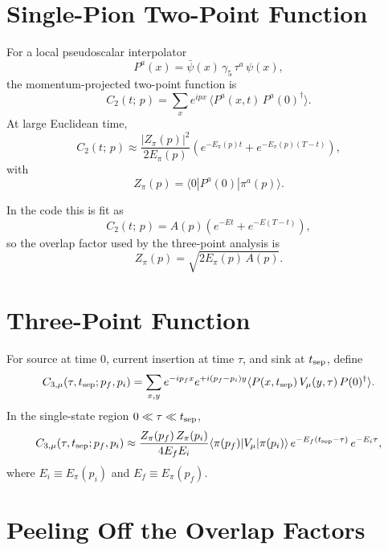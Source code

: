 \documentclass[11pt]{article}
\begin{document}
\section{Single-Pion Two-Point Function}
For a local pseudoscalar interpolator
\begin{equation}
  P^a(x) = \bar\psi(x)\,\gamma_5\,\tau^a\,\psi(x),
\end{equation}
the momentum-projected two-point function is
\begin{equation}
  C_2(t;\,p)
  =
  \sum_x e^{ipx}\,
  \langle P^a(x,t)\,P^a(0)^\dagger \rangle.
\end{equation}
At large Euclidean time,
\begin{equation}
  C_2(t;\,p)
  \approx
  \frac{|Z_\pi(p)|^2}{2E_\pi(p)}
  \left(
    e^{-E_\pi(p)t}
    +
    e^{-E_\pi(p)(T-t)}
  \right),
\end{equation}
with
\begin{equation}
  Z_\pi(p) = \langle 0|P^a(0)|\pi^a(p)\rangle.
\end{equation}

In the code this is fit as
\begin{equation}
  C_2(t;\,p) = A(p)\left(e^{-Et}+e^{-E(T-t)}\right),
\end{equation}
so the overlap factor used by the three-point analysis is
\begin{equation}
  Z_\pi(p) = \sqrt{2E_\pi(p)\,A(p)}.
\end{equation}

\section{Three-Point Function}
For source at time $0$, current insertion at time $\tau$, and sink at
$t_{\rm sep}$, define
\begin{equation}
  C_{3,\mu}(\tau,t_{\rm sep};p_f,p_i)
  =
  \sum_{x,y}
  e^{-ip_f x}
  e^{+i(p_f-p_i)y}
  \langle
    P(x,t_{\rm sep})\,
    V_\mu(y,\tau)\,
    P(0)^\dagger
  \rangle.
\end{equation}
In the single-state region $0 \ll \tau \ll t_{\rm sep}$,
\begin{equation}
  C_{3,\mu}(\tau,t_{\rm sep};p_f,p_i)
  \approx
  \frac{Z_\pi(p_f)\,Z_\pi(p_i)}{4E_fE_i}
  \langle \pi(p_f)|V_\mu|\pi(p_i)\rangle\,
  e^{-E_f(t_{\rm sep}-\tau)}\,e^{-E_i\tau},
\end{equation}
where $E_i \equiv E_\pi(p_i)$ and $E_f \equiv E_\pi(p_f)$.

\section{Peeling Off the Overlap Factors}
\end{document}
